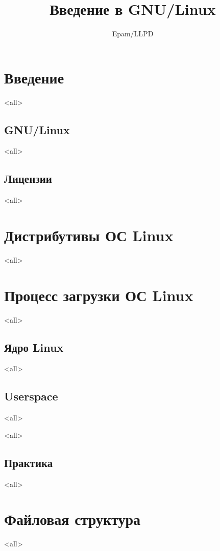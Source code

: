 \documentclass[ignorenonframetext,professionalfonts, hyperref={pdftex, unicode}]{beamer}
\title{Введение в GNU/Linux}
\author{Epam/LLPD}
\begin{document}
\section{Введение}


\frame{
	\frametitle{}
	\titlepage
	\vspace{-0.5cm}
	\begin{center}
	\end{center}
}
\frame{
	\tableofcontents
}







\mode<all>{}

\subsection{GNU/Linux}

\mode<all>{}

\subsection{Лицензии}

\mode<all>{}

\section{Дистрибутивы ОС Linux}

\mode<all>{}

\section{Процесс загрузки ОС Linux}

\mode<all>{}

\subsection{Ядро Linux}

\mode<all>{}

\subsection{Userspace}

\mode<all>{}

\mode<all>{}

\subsection{Практика}

\mode<all>{}

\section*{Файловая структура}

\mode<all>{}
\end{document}

